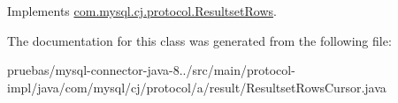 Implements \mbox{\hyperlink{interfacecom_1_1mysql_1_1cj_1_1protocol_1_1_resultset_rows_a813efe790e18424a02b692a3f9213446}{com.\+mysql.\+cj.\+protocol.\+Resultset\+Rows}}.



The documentation for this class was generated from the following file\+:\begin{DoxyCompactItemize}
\item 
pruebas/mysql-\/connector-\/java-\/8../src/main/protocol-\/impl/java/com/mysql/cj/protocol/a/result/Resultset\+Rows\+Cursor.\+java\end{DoxyCompactItemize}
